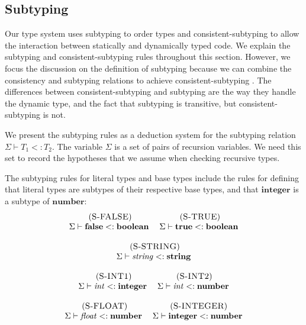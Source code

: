 \documentclass{sigplanconf}
\newcommand{\False}{\mathbf{false}}
\newcommand{\True}{\mathbf{true}}
\newcommand{\Boolean}{\mathbf{boolean}}
\newcommand{\Integer}{\mathbf{integer}}
\newcommand{\Number}{\mathbf{number}}
\newcommand{\String}{\mathbf{string}}
\newcommand{\mylabel}[1]{\; (\textsc{#1})}
\newcommand{\senv}{\Sigma}
\newcommand{\subtype}{<:}
\begin{document}
\subsection{Subtyping}

Our type system uses subtyping \cite{cardelli1984smi,abadi1996to} to order
types and consistent-subtyping \cite{siek2007objects,siek2013mutable}
to allow the interaction between statically and dynamically typed code.
We explain the subtyping and consistent-subtyping rules throughout this section.
However, we focus the discussion on the definition of subtyping because
we can combine the consistency and subtyping relations to achieve
consistent-subtyping \cite{siek2007objects,siek2013mutable}.
The differences between consistent-subtyping and subtyping are the way
they handle the dynamic type, and the fact that subtyping is transitive,
but consistent-subtyping is not.

We present the subtyping rules as a deduction system for the
subtyping relation $\senv \vdash T_{1} \subtype T_{2}$.
The variable $\senv$ is a set of pairs of recursion variables.
We need this set to record the hypotheses that we assume when checking
recursive types.

The subtyping rules for literal types and base types include the rules
for defining that literal types are subtypes of their respective base types,
and that $\Integer$ is a subtype of $\Number$:
\[
\begin{array}{c}
\begin{array}{c}
\mylabel{S-FALSE}\\
\senv \vdash \False \subtype \Boolean
\end{array}
\;
\begin{array}{c}
\mylabel{S-TRUE}\\
\senv \vdash \True \subtype \Boolean
\end{array}
\\ \\
\begin{array}{c}
\mylabel{S-STRING}\\
\senv \vdash {\it string} \subtype \String
\end{array}
\\ \\
\begin{array}{c}
\mylabel{S-INT1}\\
\senv \vdash {\it int} \subtype \Integer
\end{array}
\;
\begin{array}{c}
\mylabel{S-INT2}\\
\senv \vdash {\it int} \subtype \Number
\end{array}
\\ \\
\begin{array}{c}
\mylabel{S-FLOAT}\\
\senv \vdash {\it float} \subtype \Number
\end{array}
\;
\begin{array}{c}
\mylabel{S-INTEGER}\\
\senv \vdash \Integer \subtype \Number
\end{array}
\end{array}
\]
\end{document}
